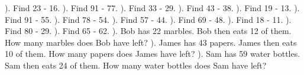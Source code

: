 \documentclass{article}%
\begin{document}
). Find 23 {-} 16.%
\newline%
\newline%
). Find 91 {-} 77.%
\newline%
\newline%
). Find 33 {-} 29.%
\newline%
\newline%
). Find 43 {-} 38.%
\newline%
\newline%
). Find 19 {-} 13.%
\newline%
\newline%
). Find 91 {-} 55.%
\newline%
\newline%
). Find 78 {-} 54.%
\newline%
\newline%
). Find 57 {-} 44.%
\newline%
\newline%
). Find 69 {-} 48.%
\newline%
\newline%
). Find 18 {-} 11.%
\newline%
\newline%
). Find 80 {-} 29.%
\newline%
\newline%
). Find 65 {-} 62.%
\newline%
\newline%
). Bob has 22 marbles. Bob then eats 12 of them. How many marbles does Bob have left?%
\newline%
\newline%
). James has 43 papers. James then eats 10 of them. How many papers does James have left?%
\newline%
\newline%
). Sam has 59 water bottles. Sam then eats 24 of them. How many water bottles does Sam have left?%
\end{document}
